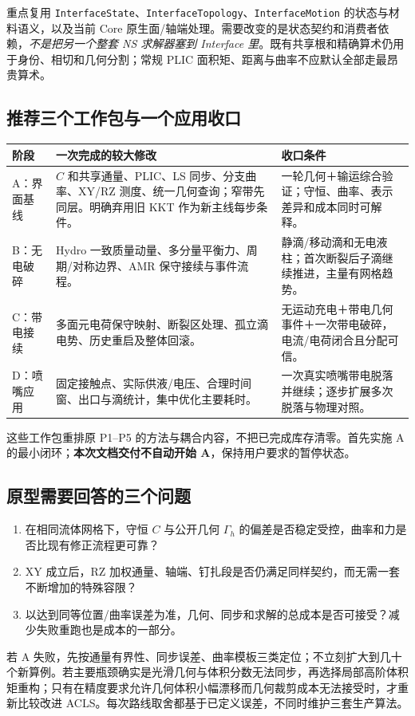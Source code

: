 \documentclass[11pt,a4paper]{article}
\newcommand{\code}[1]{{\small\nolinkurl{#1}}}
\begin{document}
重点复用 \code{InterfaceState}、\code{InterfaceTopology}、\code{InterfaceMotion} 的状态与材料语义，以及当前 Core 原生面/轴端处理。需要改变的是状态契约和消费者依赖，\emph{不是把另一个整套 NS 求解器塞到 Interface 里}。既有共享根和精确算术仍用于身份、相切和几何分割；常规 PLIC 面积矩、距离与曲率不应默认全部走最昂贵算术。

\subsection{推荐三个工作包与一个应用收口}
\begin{longtable}{L{18mm}L{81mm}L{46mm}}
\toprule 阶段 & 一次完成的较大修改 & 收口条件\\\midrule\endhead
A：界面基线 & $C$ 和共享通量、PLIC、LS 同步、分支曲率、XY/RZ 测度、统一几何查询；窄带先同层。明确弃用旧 KKT 作为新主线每步条件。 & 一轮几何＋输运综合验证；守恒、曲率、表示差异和成本同时可解释。\\
B：无电破碎 & Hydro 一致质量动量、多分量平衡力、周期/对称边界、AMR 保守接续与事件流程。 & 静滴/移动滴和无电液柱；首次断裂后子滴继续推进，主量有网格趋势。\\
C：带电接续 & 多面元电荷保守映射、断裂区处理、孤立滴电势、历史重启及整体回滚。 & 无运动充电＋带电几何事件＋一次带电破碎，电流/电荷闭合且分配可信。\\
D：喷嘴应用 & 固定接触点、实际供液/电压、合理时间窗、出口与滴统计，集中优化主要耗时。 & 一次真实喷嘴带电脱落并继续；逐步扩展多次脱落与物理对照。\\\bottomrule
\end{longtable}
这些工作包重排原 P1--P5 的方法与耦合内容，不把已完成库存清零。首先实施 A 的最小闭环；\textbf{本次文档交付不自动开始 A}，保持用户要求的暂停状态。

\subsection{原型需要回答的三个问题}
\begin{enumerate}
\item 在相同流体网格下，守恒 $C$ 与公开几何 $\Gamma_h$ 的偏差是否稳定受控，曲率和力是否比现有修正流程更可靠？
\item XY 成立后，RZ 加权通量、轴端、钉扎段是否仍满足同样契约，而无需一套不断增加的特殊容限？
\item 以达到同等位置/曲率误差为准，几何、同步和求解的总成本是否可接受？减少失败重跑也是成本的一部分。
\end{enumerate}
若 A 失败，先按通量有界性、同步误差、曲率模板三类定位；不立刻扩大到几十个新算例。若主要瓶颈确实是光滑几何与体积分数无法同步，再选择局部高阶体积矩重构；只有在精度要求允许几何体积小幅漂移而几何裁剪成本无法接受时，才重新比较改进 ACLS。每次路线取舍都基于已定义误差，不同时维护三套生产算法。
\end{document}
